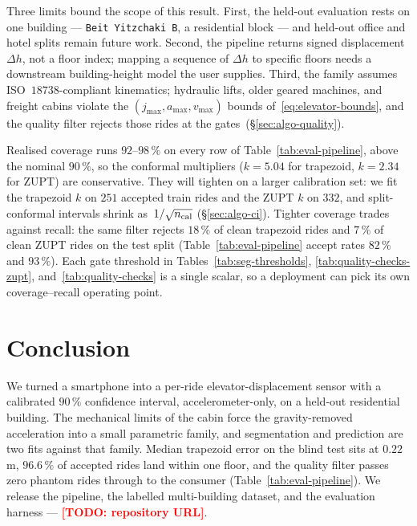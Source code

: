 \documentclass[manuscript,review,screen]{acmart}
\newcommand{\todo}[1]{\textcolor{red}{\textbf{[TODO: #1]}}}
\begin{document}
Three limits bound the scope of this result.  First, the held-out
evaluation rests on one building --- \texttt{Beit Yitzchaki~B}, a
residential block --- and held-out office and hotel splits remain
future work.  Second, the pipeline returns signed displacement
$\Delta h$, not a floor index; mapping a sequence of $\Delta h$ to
specific floors needs a downstream building-height model the user
supplies.  Third, the family assumes ISO~$18738$-compliant kinematics;
hydraulic lifts, older geared machines, and freight cabins violate the
$(j_{\max},a_{\max},v_{\max})$ bounds of~\eqref{eq:elevator-bounds},
and the quality filter rejects those rides at the
gates~(\S\ref{sec:algo-quality}).

Realised coverage runs $92$--$98\,\%$ on every row of
Table~\ref{tab:eval-pipeline}, above the nominal $90\,\%$, so the
conformal multipliers ($k\!=\!5.04$ for trapezoid, $k\!=\!2.34$ for
ZUPT) are conservative.  They will tighten on a larger calibration
set: we fit the trapezoid $k$ on $251$ accepted train rides and the
ZUPT $k$ on $332$, and split-conformal intervals shrink
as~$1/\sqrt{n_{\rm cal}}$ (\S\ref{sec:algo-ci}).  Tighter coverage
trades against recall: the same filter rejects $18\,\%$ of clean
trapezoid rides and $7\,\%$ of clean ZUPT rides on the test split
(Table~\ref{tab:eval-pipeline} accept rates $82\,\%$ and $93\,\%$).
Each gate threshold in Tables~\ref{tab:seg-thresholds},
\ref{tab:quality-checks-zupt}, and~\ref{tab:quality-checks} is a
single scalar, so a deployment can pick its own coverage--recall
operating point.

\section{Conclusion}
\label{sec:conclusion}

We turned a smartphone into a per-ride elevator-displacement sensor
with a calibrated $90\,\%$ confidence interval, accelerometer-only, on
a held-out residential building.  The mechanical limits of the cabin
force the gravity-removed acceleration into a small parametric family,
and segmentation and prediction are two fits against that family.
Median trapezoid error on the blind test sits at $0.22\,$m, $96.6\,\%$
of accepted rides land within one floor, and the quality filter passes
zero phantom rides through to the consumer
(Table~\ref{tab:eval-pipeline}).  We release the pipeline, the
labelled multi-building dataset, and the evaluation harness ---
\todo{repository URL}.
\end{document}
